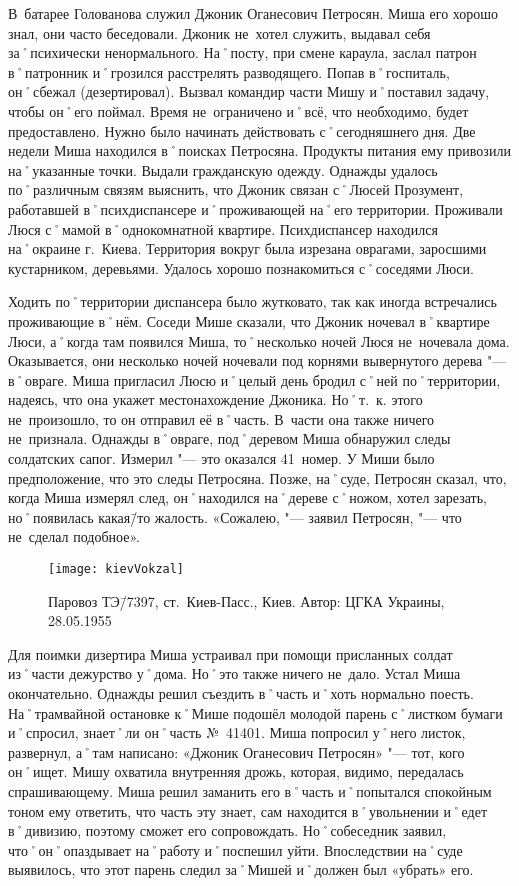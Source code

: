 В~батарее Голованова служил Джоник Оганесович Петросян. Миша его хорошо знал, они часто беседовали. Джоник не~хотел служить, выдавал себя за˚психически ненормального. На˚посту, при смене караула, заслал патрон в˚патронник и˚грозился расстрелять разводящего. Попав в˚госпиталь, он˚сбежал (дезертировал). Вызвал командир части Мишу и˚поставил задачу, чтобы он˚его поймал. Время не~ограничено и˚всё, что необходимо, будет предоставлено. Нужно было начинать действовать с˚сегодняшнего дня. Две недели Миша находился в˚поисках Петросяна. Продукты питания ему привозили на˚указанные точки. Выдали гражданскую одежду. Однажды удалось по˚различным связям выяснить, что Джоник связан с˚Люсей Прозумент, работавшей в˚психдиспансере и˚проживающей на˚его территории. Проживали Люся с˚мамой в˚однокомнатной квартире. Психдиспансер находился на˚окраине г.~Киева. Территория вокруг была изрезана оврагами, заросшими кустарником, деревьями. Удалось хорошо познакомиться с˚соседями Люси. 

Ходить по˚территории диспансера было жутковато, так как иногда встречались проживающие в˚нём. Соседи Мише сказали, что Джоник ночевал в˚квартире Люси, а˚когда там появился Миша, то˚несколько ночей Люся не~ночевала дома. Оказывается, они несколько ночей ночевали под корнями вывернутого дерева "--- в˚овраге. Миша пригласил Люсю и˚целый день бродил с˚ней по˚территории, надеясь, что она укажет местонахождение Джоника. Но˚т.~к. этого не~произошло, то он отправил её в˚часть. В~части она также ничего не~признала. Однажды в˚овраге, под˚деревом Миша обнаружил следы солдатских сапог. Измерил "--- это оказался 41~номер. У Миши  было предположение, что это следы Петросяна. Позже, на˚суде, Петросян сказал, что, когда Миша измерял след, он˚находился на˚дереве с˚ножом, хотел зарезать, но˚появилась какая\=/то жалость. «Сожалею, "--- заявил Петросян, "--- что не~сделал подобное».  

\begin{wrapfigure}{O}{.4\textwidth}
\centering
\texttt{[image: kievVokzal]}
\caption{Паровоз ТЭ\=/7397, ст.~Киев-Пасс., Киев. Автор: ЦГКА Украины, 28.05.1955}
\label{fig:kievVokzal}
\end{wrapfigure}

Для поимки дизертира Миша устраивал при помощи присланных солдат из˚части дежурство у˚дома. Но˚это также ничего не~дало. Устал Миша окончательно. Однажды решил съездить в˚часть и˚хоть нормально поесть. На˚трамвайной остановке к˚Мише подошёл молодой парень с˚листком бумаги и˚спросил, знает˚ли он˚часть №~41401. Миша попросил у˚него листок, развернул, а˚там написано: «Джоник Оганесович Петросян» "--- тот, кого он˚ищет. Мишу охватила внутренняя дрожь, которая, видимо, передалась спрашивающему. Миша решил заманить его в˚часть и˚попытался спокойным тоном ему ответить, что часть эту знает, сам находится в˚увольнении и˚едет в˚дивизию, поэтому сможет его сопровождать.  Но˚собеседник заявил, что˚он˚опаздывает на˚работу и˚поспешил уйти. Впоследствии на˚суде выявилось, что этот парень следил за˚Мишей и˚должен был «убрать» его.

